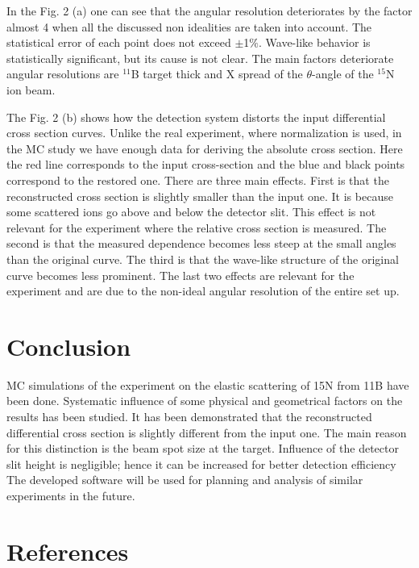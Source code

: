 \documentclass[%
 aip,
cp,  %
 amsmath,amssymb,%
 reprint,%
]{revtex4-2}
\begin{document}
In the Fig. 2 (a) one can see that the angular resolution deteriorates by the factor almost 4 when all the discussed non idealities are taken into account. The statistical error of each point does not exceed $\pm$1$\%$. Wave-like behavior is statistically significant, but its cause is not clear. The main factors deteriorate angular resolutions are ${}^{11}$B target thick and X spread of the $\theta$-angle of the ${}^{15}$N ion beam.

The Fig. 2 (b) shows how the detection system distorts the input differential cross section curves. Unlike the real experiment, where normalization is used, in the MC study we have enough data for deriving the absolute cross section. Here the red line corresponds to the input cross-section and the blue and black points correspond to the restored one. There are three main effects. First is that the reconstructed cross section is slightly smaller than the input one. It is because some scattered ions go above and below the detector slit. This effect is not relevant for the experiment where the relative cross section is measured. The second is that the measured dependence becomes less steep at the small angles than the original curve. The third is that the wave-like structure of the original curve becomes less prominent. The last two effects are relevant for the experiment and are due to the non-ideal angular resolution of the entire set up.

\section{Conclusion}

MC simulations of the experiment on the elastic scattering of 15N from 11B have been done. Systematic influence of some physical and geometrical factors on the results has been studied. It has been demonstrated that the reconstructed differential cross section is slightly different from the input one. The main reason for this distinction is the beam spot size at the target. Influence of the detector slit height is negligible; hence it can be increased for better detection efficiency The developed software will be used for planning and analysis of similar experiments in the future.

\section{References}
\end{document}
